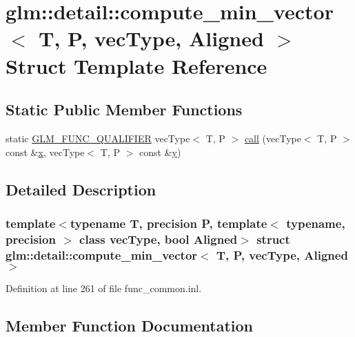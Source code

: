 \hypertarget{structglm_1_1detail_1_1compute__min__vector}{}\section{glm\+::detail\+::compute\+\_\+min\+\_\+vector$<$ T, P, vec\+Type, Aligned $>$ Struct Template Reference}
\label{structglm_1_1detail_1_1compute__min__vector}
\subsection*{Static Public Member Functions}
\begin{DoxyCompactItemize}
\item 
static \mbox{\hyperlink{setup_8hpp_a33fdea6f91c5f834105f7415e2a64407}{G\+L\+M\+\_\+\+F\+U\+N\+C\+\_\+\+Q\+U\+A\+L\+I\+F\+I\+ER}} vec\+Type$<$ T, P $>$ \mbox{\hyperlink{structglm_1_1detail_1_1compute__min__vector_adf7bbbad7f135247d5d573140c437881}{call}} (vec\+Type$<$ T, P $>$ const \&\mbox{\hyperlink{glad_8h_a92d0386e5c19fb81ea88c9f99644ab1d}{x}}, vec\+Type$<$ T, P $>$ const \&\mbox{\hyperlink{glad_8h_a66ddd433d2cacfe27f5906b7e86faeed}{y}})
\end{DoxyCompactItemize}


\subsection{Detailed Description}
\subsubsection*{template$<$typename T, precision P, template$<$ typename, precision $>$ class vec\+Type, bool Aligned$>$\newline
struct glm\+::detail\+::compute\+\_\+min\+\_\+vector$<$ T, P, vec\+Type, Aligned $>$}



Definition at line 261 of file func\+\_\+common.\+inl.



\subsection{Member Function Documentation}
\mbox{\label{structglm_1_1detail_1_1compute__min__vector_adf7bbbad7f135247d5d573140c437881}} 
